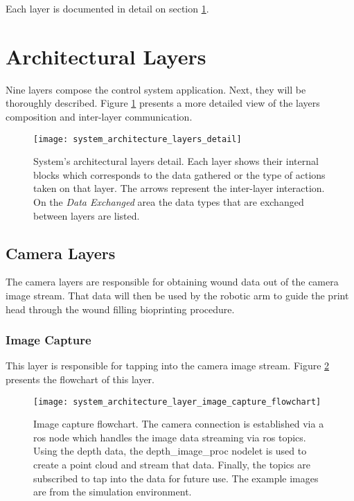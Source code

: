 Each layer is documented in detail on section \ref{sec:system_architectural_layers}.



\section{Architectural Layers}
\label{sec:system_architectural_layers}

Nine layers compose the control system application. Next, they will be thoroughly described. Figure \ref{fig:system_architecture_layers_detail} presents a more detailed view of the layers composition and inter-layer communication.

\begin{figure}[htbp]
	\centering
	\texttt{[image: system\_architecture\_layers\_detail]}
	\caption{System's architectural layers detail. Each layer shows their internal blocks which corresponds to the data gathered or the type of actions taken on that layer. The arrows represent the inter-layer interaction. On the \textit{Data Exchanged} area the data types that are exchanged between layers are listed. }
	\label{fig:system_architecture_layers_detail}
\end{figure}

\subsection{Camera Layers}
\label{subsec:system_architectural_camera_layers}

The camera layers are responsible for obtaining wound data out of the camera image stream. That data will then be used by the robotic arm to guide the print head through the wound filling bioprinting procedure.

\subsubsection*{Image Capture}
\label{subsubsec:system_architectural_camera_layers_image_capture}

This layer is responsible for tapping into the camera image stream. Figure \ref{fig:system_architecture_layer_image_capture_flowchart} presents the flowchart of this layer.\\

\begin{figure}[htbp]
	\centering
	\texttt{[image: system\_architecture\_layer\_image\_capture\_flowchart]}
	\caption{Image capture flowchart. The camera connection is established via a \gls{ros} node which handles the image data streaming via \gls{ros} topics. Using the depth data, the depth\_image\_proc nodelet is used to create a point cloud and stream that data. Finally, the topics are subscribed to tap into the data for future use.
	The example images are from the simulation environment.}
	\label{fig:system_architecture_layer_image_capture_flowchart}
\end{figure}

